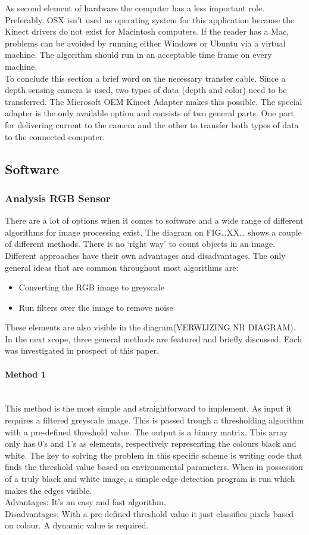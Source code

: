 \documentclass[11pt]{article}
\begin{document}
As second element of hardware the computer has a less important role. Preferably, OSX isn't used as operating system for this application because the Kinect drivers do not exist for Macintosh computers. If the reader has a Mac, problems can be avoided by running either Windows or Ubuntu via a virtual machine. The algorithm should run in an acceptable time frame on every machine.\\
To conclude this section a brief word on the necessary transfer cable. Since a depth sensing camera is used, two types of data (depth and color) need to be transferred. The Microsoft OEM Kinect Adapter makes this possible. The special adapter is the only available option and consists of two general parts. One part for delivering current to the camera and the other to transfer both types of data to the connected computer.


\subsection{Software}

\subsubsection{Analysis RGB Sensor}
There are a lot of options when it comes to software and a wide range of different algorithms for image processing exist. The diagram on FIG…XX… shows a couple of different methods. There is no ‘right way’ to count objects in an image. Different approaches have their own advantages and disadvantages. The only general ideas that are common throughout most algorithms are:
\begin{itemize}
\item Converting the RGB image to greyscale
\item Run filters over the image to remove noise
\end{itemize}
These elements are also visible in the diagram(VERWIJZING NR DIAGRAM). In the next scope, three general methods are featured and briefly discussed. Each was investigated in prospect of this paper. 
\paragraph{Method 1}\mbox{}\\
This method is the most simple and straightforward to implement. As input it requires a filtered greyscale image. This is passed trough a thresholding algorithm with a pre-defined threshold value. The output is a binary matrix. This array only has 0's and 1's as elements, respectively representing the colours black and white. The key to solving the problem in this specific scheme is writing code that finds the threshold value based on environmental parameters. When in possession of a truly black and white image, a simple edge detection program is run which makes the edges visible.
\\Advantages: It’s an easy and fast algorithm.
\\Disadvantages: With a pre-defined threshold value it just classifies pixels based on colour. A dynamic value is required.
\end{document}
